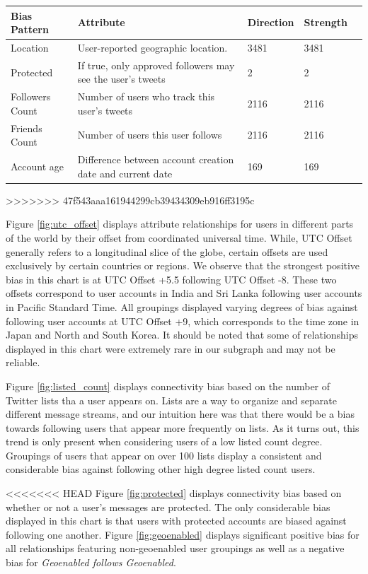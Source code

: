 \noindent \begin{tabular}[t]{| p{1in} | p{1.75in} | p{1in} | p{1in} | p{1.25in} |}
\hline
\textbf{Bias Pattern} & \textbf{Attribute} & \textbf{Direction} & \textbf{Strength}  \\ \hline
Location & User-reported geographic location. & 3481 & 3481  \\ \hline
Protected & If true, only approved followers may see the user's tweets & 2 & 2  \\ \hline
Followers Count & Number of users who track this user's tweets & 2116 & 2116 \\ \hline
Friends Count & Number of users this user follows & 2116 & 2116 \\ \hline
Account age & Difference between account creation date and current date & 169 & 169  \\ \hline
\end{tabular}
>>>>>>> 47f543aaa161944299cb39434309eb916ff3195c

Figure \ref{fig:utc_offset} displays attribute relationships for users in different parts of the world by their offset from coordinated universal time.  While, UTC Offset generally refers to a longitudinal slice of the globe, certain offsets are used exclusively by certain countries or regions.  We observe that the strongest positive bias in this chart is at UTC Offset +5.5 following UTC Offset -8.  These two offsets correspond to user accounts in India and Sri Lanka following user accounts in Pacific Standard Time.  All groupings displayed varying degrees of bias against following user accounts at UTC Offset +9, which corresponds to the time zone in Japan and North and South Korea.  It should be noted that some of relationships displayed in this chart were extremely rare in our subgraph and may not be reliable.
 
Figure \ref{fig:listed_count} displays connectivity bias based on the number of Twitter lists tha a user appears on.  Lists are a way to organize and separate different message streams, and our intuition here was that there would be a bias towards following users that appear more frequently on lists.  As it turns out, this trend is only present when considering users of a low listed count degree.  Groupings of users that appear on over 100 lists display a consistent and considerable bias against following other high degree listed count users.

<<<<<<< HEAD
Figure \ref{fig:protected} displays connectivity bias based on whether or not a user's messages are protected.  The only considerable bias displayed in this chart is that users with protected accounts are biased against following one another.  Figure \ref{fig:geoenabled} displays significant positive bias for all relationships featuring non-geoenabled user groupings as well as a negative bias for \textit{Geoenabled follows Geoenabled}.

